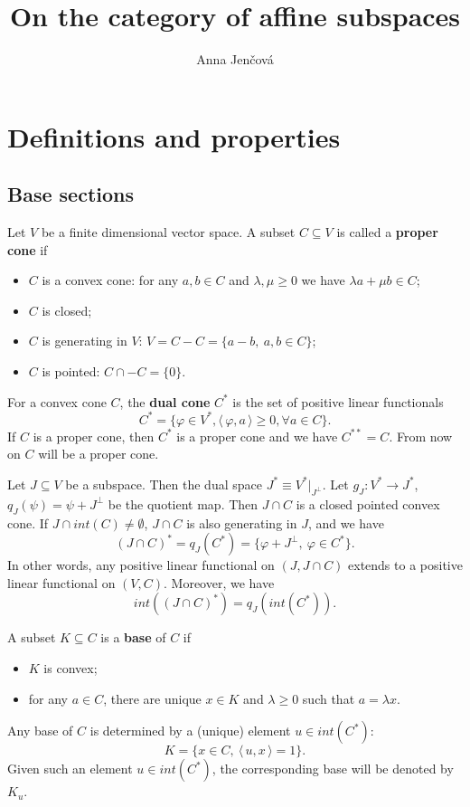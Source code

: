 \documentclass[12pt]{article}
\title{On the category of affine subspaces}
\author{Anna Jen\v cov\'a}
\theoremstyle{definition}
\theoremstyle{remark}
\def\<{\langle\,}
\def\>{\,\rangle}
\begin{document}
\maketitle

\section{Definitions and properties}

\subsection{Base sections}

Let  $V$ be  a finite dimensional vector space. A subset $C\subseteq V$ is called a
\textbf{proper
cone} if 
\begin{itemize}
\item $C$ is a convex cone: for any $a,b\in C$ and $\lambda,\mu\ge 0$ we have $\lambda
a+\mu b\in C$;
\item $C$ is closed;
\item $C$ is generating in $V$: $V=C-C=\{a-b,\ a,b\in C\}$;
\item $C$ is pointed: $C\cap -C=\{0\}$. 

\end{itemize}

\medskip
\noindent
For a convex cone $C$, the \textbf{dual cone} $C^*$ is the set of positive linear
functionals 
\[
C^*=\{\varphi\in V^*,
\<\varphi,a\>\ge 0,\forall a\in C\}.
\]
If $C$ is a proper cone, then $C^*$ is a proper cone and we have $C^{**}=C$. 
From now on $C$ will be a proper cone.

\medskip
\noindent
Let $J\subseteq V$ be a subspace. Then the dual space $J^*\equiv V^*|_{J^\perp}$. Let
$g_J: V^*\to J^*$, $q_J(\psi)=\psi+J^\perp$ be the quotient map.  Then $J\cap C$ is a closed pointed convex cone. If
$J\cap int(C)\ne \emptyset$, $J\cap C$ is also generating in $J$, and we have
\[
(J\cap C)^*=q_J(C^*)=\{\varphi+J^\perp,\ \varphi\in C^*\}.
\]
In other words, any positive linear functional on $(J,J\cap C)$ extends to a positive
linear functional on $(V,C)$. Moreover, we have
\[
int((J\cap C)^*)=q_J(int(C^*)).
\]

\medskip
\noindent
A subset $K\subseteq C$ is a \textbf{base} of $C$ if 
\begin{itemize}
\item $K$ is convex;
\item for any $a\in C$, there are unique $x\in K$ and $\lambda\ge 0$ such that $a=\lambda
x$.

\end{itemize}
Any base of $C$ is determined by a (unique) element $u\in int(C^*)$: 
\[
K=\{x\in C,\ \<u,x\>=1\}.
\]
Given such an element $u\in int(C^*)$, the corresponding base will be denoted by $K_u$.
\end{document}
